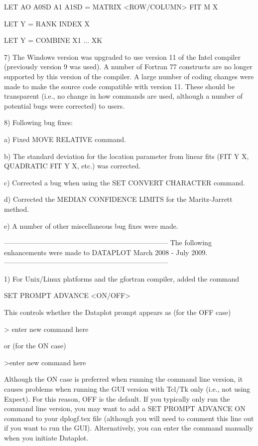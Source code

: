 {        LET AO A0SD A1 A1SD = MATRIX <ROW/COLUMN> FIT M X

        LET Y = RANK INDEX X

        LET Y = COMBINE X1 ... XK

 7) The Windows version was upgraded to use version 11 of the
    Intel compiler (previously version 9 was used).  A number of
    Fortran 77 constructs are no longer supported by this version
    of the compiler.  A large number of coding changes were made
    to make the source code compatible with version 11.  These
    should be transparent (i.e., no change in how commands are
    used, although a number of potential bugs were corrected) to
    users.

 8) Following bug fixes:

    a) Fixed MOVE RELATIVE command.

    b) The standard deviation for the location parameter from
       linear fits (FIT Y X, QUADRATIC FIT Y X, etc.) was
       corrected.

    c) Corrected a bug when using the SET CONVERT CHARACTER command.

    d) Corrected the MEDIAN CONFIDENCE LIMITS for the Maritz-Jarrett
       method.

    e) A number of other miscellaneous bug fixes were made.

-----------------------------------------------------------------------
The following enhancements were made to DATAPLOT
March 2008 - July       2009.
-----------------------------------------------------------------------

 1) For Unix/Linux platforms and the gfortran compiler, added the
    command

       SET PROMPT ADVANCE <ON/OFF>

    This controls whether the Dataplot prompt appears as
    (for the OFF case)

       >
         enter new command here

    or (for the ON case)

       >enter new command here

    Although the ON case is preferred when running the command
    line version, it causes problems when running the GUI version
    with Tcl/Tk only (i.e., not using Expect).  For this reason,
    OFF is the default.  If you typically only run the command
    line version, you may want to add a SET PROMPT ADVANCE ON
    command to your dplogf.tex file (although you will need to
    comment this line out if you want to run the GUI).  Alternatively,
    you can enter the command manually when you initiate Dataplot.
    
}
